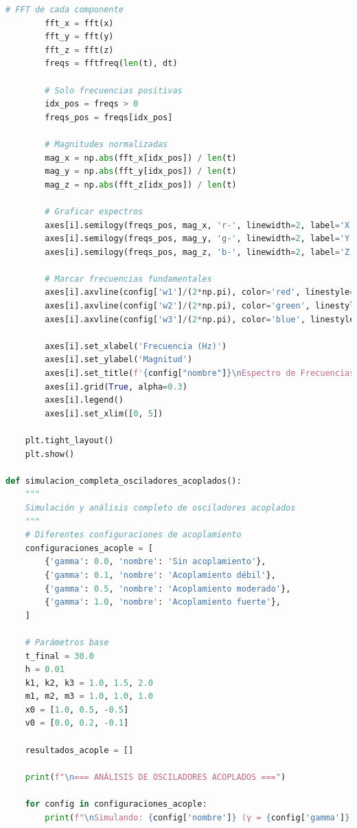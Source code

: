\documentclass{article}
\begin{document}
\begin{lstlisting}[language=Python, caption={Análisis completo de figuras de Lissajous 3D y osciladores acoplados}]
        # FFT de cada componente
        fft_x = fft(x)
        fft_y = fft(y)
        fft_z = fft(z)
        freqs = fftfreq(len(t), dt)
        
        # Solo frecuencias positivas
        idx_pos = freqs > 0
        freqs_pos = freqs[idx_pos]
        
        # Magnitudes normalizadas
        mag_x = np.abs(fft_x[idx_pos]) / len(t)
        mag_y = np.abs(fft_y[idx_pos]) / len(t)
        mag_z = np.abs(fft_z[idx_pos]) / len(t)
        
        # Graficar espectros
        axes[i].semilogy(freqs_pos, mag_x, 'r-', linewidth=2, label='X', alpha=0.7)
        axes[i].semilogy(freqs_pos, mag_y, 'g-', linewidth=2, label='Y', alpha=0.7)
        axes[i].semilogy(freqs_pos, mag_z, 'b-', linewidth=2, label='Z', alpha=0.7)
        
        # Marcar frecuencias fundamentales
        axes[i].axvline(config['w1']/(2*np.pi), color='red', linestyle='--', alpha=0.5)
        axes[i].axvline(config['w2']/(2*np.pi), color='green', linestyle='--', alpha=0.5)
        axes[i].axvline(config['w3']/(2*np.pi), color='blue', linestyle='--', alpha=0.5)
        
        axes[i].set_xlabel('Frecuencia (Hz)')
        axes[i].set_ylabel('Magnitud')
        axes[i].set_title(f'{config["nombre"]}\nEspectro de Frecuencias')
        axes[i].grid(True, alpha=0.3)
        axes[i].legend()
        axes[i].set_xlim([0, 5])
    
    plt.tight_layout()
    plt.show()

def simulacion_completa_osciladores_acoplados():
    """
    Simulación y análisis completo de osciladores acoplados
    """
    # Diferentes configuraciones de acoplamiento
    configuraciones_acople = [
        {'gamma': 0.0, 'nombre': 'Sin acoplamiento'},
        {'gamma': 0.1, 'nombre': 'Acoplamiento débil'},
        {'gamma': 0.5, 'nombre': 'Acoplamiento moderado'},
        {'gamma': 1.0, 'nombre': 'Acoplamiento fuerte'},
    ]
    
    # Parámetros base
    t_final = 30.0
    h = 0.01
    k1, k2, k3 = 1.0, 1.5, 2.0
    m1, m2, m3 = 1.0, 1.0, 1.0
    x0 = [1.0, 0.5, -0.5]
    v0 = [0.0, 0.2, -0.1]
    
    resultados_acople = []
    
    print(f"\n=== ANÁLISIS DE OSCILADORES ACOPLADOS ===")
    
    for config in configuraciones_acople:
        print(f"\nSimulando: {config['nombre']} (γ = {config['gamma']})")
        

\end{lstlisting}
\end{document}
